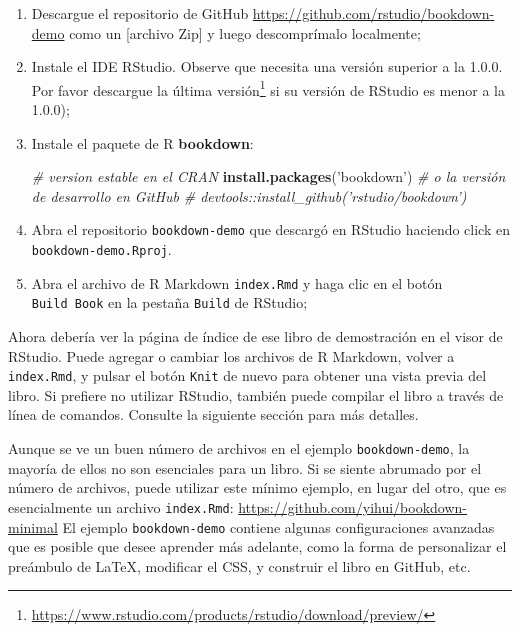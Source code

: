 \documentclass[12pt,]{krantz}
\makeatletter
\newenvironment{Shaded}{\begin{snugshade}}{\end{snugshade}}
\newcommand{\KeywordTok}[1]{\textcolor[rgb]{0.13,0.29,0.53}{\textbf{#1}}}
\newcommand{\StringTok}[1]{\textcolor[rgb]{0.31,0.60,0.02}{#1}}
\newcommand{\CommentTok}[1]{\textcolor[rgb]{0.56,0.35,0.01}{\textit{#1}}}
\newcommand{\NormalTok}[1]{#1}
\renewcommand{\href}[2]{#2\footnote{\url{#1}}}
\newenvironment{kframe}{%
\medskip{}
\setlength{\fboxsep}{.8em}
 \def\at@end@of@kframe{}%
 \ifinner\ifhmode%
  \def\at@end@of@kframe{\end{minipage}}%
  \begin{minipage}{\columnwidth}%
 \fi\fi%
 \def\FrameCommand##1{\hskip\@totalleftmargin \hskip-\fboxsep
 \colorbox{shadecolor}{##1}\hskip-\fboxsep
     \hskip-\linewidth \hskip-\@totalleftmargin \hskip\columnwidth}%
 \MakeFramed {\advance\hsize-\width
   \@totalleftmargin\z@ \linewidth\hsize
   \@setminipage}}%
 {\par\unskip\endMakeFramed%
 \at@end@of@kframe}
\renewenvironment{Shaded}{\begin{kframe}}{\end{kframe}}
\theoremstyle{definition}
\theoremstyle{definition}
\theoremstyle{definition}
\theoremstyle{remark}
\makeatother
\begin{document}
\begin{enumerate}
\def\labelenumi{\arabic{enumi}.}
\item
  Descargue el repositorio de GitHub
  \url{https://github.com/rstudio/bookdown-demo} como un {[}archivo
  Zip{]} y luego descomprímalo localmente;
\item
  Instale el IDE RStudio. Observe que necesita una versión superior a la
  1.0.0. Por favor
  \href{https://www.rstudio.com/products/rstudio/download/preview/}{descargue
  la última versión} si su versión de RStudio es menor a la 1.0.0);
\item
  Instale el paquete de R \textbf{bookdown}:

\begin{Shaded}
\begin{Highlighting}[]
\CommentTok{# version estable en el CRAN}
\KeywordTok{install.packages}\NormalTok{(}\StringTok{'bookdown'}\NormalTok{)}
\CommentTok{# o la versión de desarrollo en GitHub}
\CommentTok{# devtools::install_github('rstudio/bookdown')}
\end{Highlighting}
\end{Shaded}
\item
  Abra el repositorio \texttt{bookdown-demo} que descargó en RStudio
  haciendo click en \texttt{bookdown-demo.Rproj}.
\item
  Abra el archivo de R Markdown \texttt{index.Rmd} y haga clic en el
  botón \texttt{Build\ Book} en la pestaña \texttt{Build} de RStudio;
\end{enumerate}

Ahora debería ver la página de índice de ese libro de demostración en el
visor de RStudio. Puede agregar o cambiar los archivos de R Markdown,
volver a \texttt{index.Rmd}, y pulsar el botón \texttt{Knit} de nuevo
para obtener una vista previa del libro. Si prefiere no utilizar
RStudio, también puede compilar el libro a través de línea de comandos.
Consulte la siguiente sección para más detalles.

Aunque se ve un buen número de archivos en el ejemplo
\texttt{bookdown-demo}, la mayoría de ellos no son esenciales para un
libro. Si se siente abrumado por el número de archivos, puede utilizar
este mínimo ejemplo, en lugar del otro, que es esencialmente un archivo
\texttt{index.Rmd}: \url{https://github.com/yihui/bookdown-minimal} El
ejemplo \texttt{bookdown-demo} contiene algunas configuraciones
avanzadas que es posible que desee aprender más adelante, como la forma
de personalizar el preámbulo de LaTeX, modificar el CSS, y construir el
libro en GitHub, etc.
\end{document}
